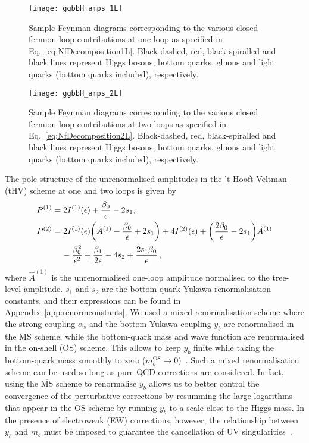 \documentclass[main.tex]{subfiles}
\begin{document}
\begin{figure}[t]
  \begin{center}
    \texttt{[image: ggbbH\_amps\_1L]}
  \end{center}
  \caption{Sample Feynman diagrams corresponding to the various closed fermion loop contributions at one loop as specified in Eq.~\eqref{eq:NfDecomposition1L}. 
  Black-dashed, red, black-spiralled and black lines represent Higgs bosons, bottom quarks, gluons and light quarks (bottom quarks included), respectively.}
  \label{fig:amp1L}
\end{figure}

\begin{figure}[t]
  \begin{center}
    \texttt{[image: ggbbH\_amps\_2L]}
  \end{center}
  \caption{Sample Feynman diagrams corresponding to the various closed fermion loop contributions at two loops as specified in Eq.~\eqref{eq:NfDecomposition2L}. 
  Black-dashed, red, black-spiralled and black lines represent Higgs bosons, bottom quarks, gluons and light quarks (bottom quarks included), respectively.}
  \label{fig:amp2L}
\end{figure}

The pole structure of the unrenormalised amplitudes in the 't Hooft-Veltman (tHV) scheme at one and two loops is given by~\cite{Catani:1998bh,Becher:2009qa,Becher:2009cu,Gardi:2009qi}
\begin{align}
P^{(1)} & = 2 I^{(1)}(\epsilon) + \frac{\beta_0}{\epsilon} - 2 s_1,  
\label{eq:poles1L} \\
P^{(2)} & =   2 I^{(1)}(\epsilon) \bigg( \hat{A}^{(1)} - \frac{\beta_0}{\epsilon} + 2 s_1\bigg) + 4 I^{(2)}(\epsilon)
                + \bigg(\frac{2\beta_0}{\epsilon}-2 s_1\bigg) \hat{A}^{(1)} \nonumber \\  
& \hspace{0.4cm} - \frac{\beta_0^2}{\epsilon^2} + \frac{\beta_1}{2\epsilon} - 4 s_2 + \frac{2 s_1\beta_0}{\epsilon} \,,
\label{eq:poles2L}
\end{align}
where $\hat{A}^{(1)}$ is the unrenormalised one-loop amplitude normalised to the tree-level amplitude.
$s_1$ and $s_2$ are the bottom-quark Yukawa renormalisation constants, and their expressions can be found in Appendix~\ref{app:renormconstants}.
We used a mixed renormalisation scheme where the strong coupling $\alpha_s$ and the bottom-Yukawa coupling $y_b$ are renormalised in the $\overline{\text{MS}}$ scheme, while the bottom-quark mass and wave function are renormalised in the on-shell ($\mathrm{OS}$) scheme. This allows to keep $y_b$ finite while taking the bottom-quark mass smoothly to zero ($m_b^{\mathrm{OS}}\rightarrow 0$)~\cite{Mondini:2021nck}.
Such a mixed renormalisation scheme can be used so long as pure QCD corrections are considered. In fact, using the $\overline{\text{MS}}$ scheme to renormalise $y_b$ allows us to better control the convergence of the perturbative corrections by resumming the large logarithms that appear in the OS scheme by running $y_b$ to a scale close to the Higgs mass. In the presence of electroweak (EW) corrections, however, the relationship between
$y_b$ and $m_b$ must be imposed to guarantee the cancellation of UV singularities~\cite{Pagani:2020rsg}.
\end{document}
